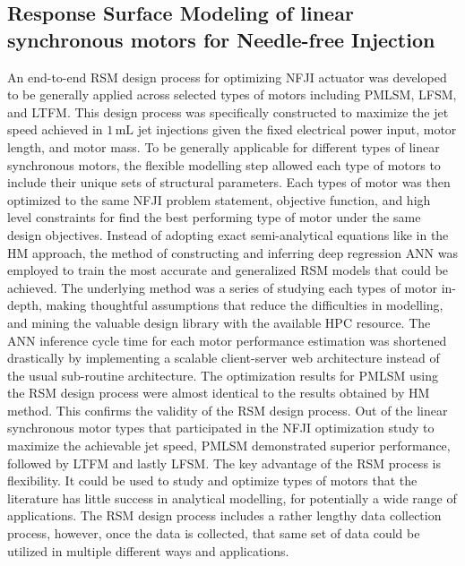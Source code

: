     
    \subsection{Response Surface Modeling of linear synchronous motors for Needle-free Injection}
    
    
        An end-to-end \acf{RSM} design process for optimizing \acs{NFJI} actuator was developed to be generally applied across selected types of motors including \acs{PMLSM}, \acf{LFSM}, and \acf{LTFM}. This design process was specifically constructed to maximize the jet speed achieved in $1\,\mathrm{mL}$ jet injections given the fixed electrical power input, motor length, and motor mass. To be generally applicable for different types of linear synchronous motors, the flexible modelling step allowed each type of motors to include their unique sets of structural parameters. Each types of motor was then optimized to the same \acs{NFJI} problem statement, objective function, and high level constraints for find the best performing type of motor under the same design objectives. Instead of adopting exact semi-analytical equations like in the \acs{HM} approach, the method of constructing and inferring deep regression \acf{ANN} was employed to train the most accurate and generalized \acs{RSM} models that could be achieved. The underlying method was a series of studying each types of motor in-depth, making thoughtful assumptions that reduce the difficulties in modelling, and mining the valuable design library with the available \acf{HPC} resource. The \acs{ANN} inference cycle time for each motor performance estimation was shortened drastically by implementing a scalable client-server web architecture instead of the usual sub-routine architecture. The optimization results for \acs{PMLSM} using the \acf{RSM} design process were almost identical to the results obtained by \acf{HM} method. This confirms the validity of the \acf{RSM} design process. Out of the linear synchronous motor types that participated in the \acs{NFJI} optimization study to maximize the achievable jet speed, \acs{PMLSM} demonstrated superior performance, followed by \acs{LTFM} and lastly \acs{LFSM}. The key advantage of the \acs{RSM} process is flexibility. It could be used to study and optimize types of motors that the literature has little success in analytical modelling, for potentially a wide range of applications. The \acs{RSM} design process includes a rather lengthy data collection process, however, once the data is collected, that same set of data could be utilized in multiple different ways and applications.
        
